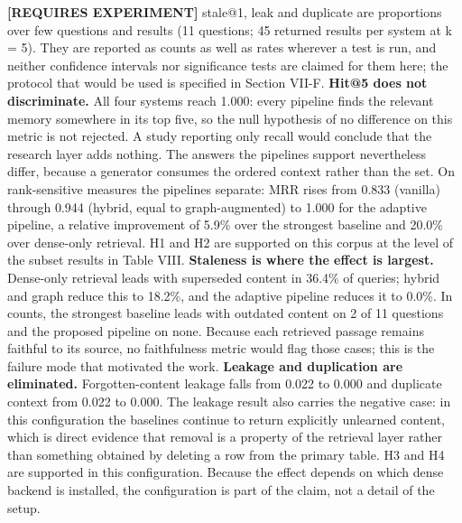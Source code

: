 \documentclass[conference]{IEEEtran}
\begin{document}
\textbf{[REQUIRES EXPERIMENT]} stale@1, leak and duplicate are proportions over few questions and results (11 questions; 45 returned results per system at k = 5). They are reported as counts as well as rates wherever a test is run, and neither confidence intervals nor significance tests are claimed for them here; the protocol that would be used is specified in Section VII-F.
\textbf{Hit@5 does not discriminate.} All four systems reach 1.000: every pipeline finds the relevant memory somewhere in its top five, so the null hypothesis of no difference on this metric is not rejected. A study reporting only recall would conclude that the research layer adds nothing. The answers the pipelines support nevertheless differ, because a generator consumes the ordered context rather than the set. On rank-sensitive measures the pipelines separate: MRR rises from 0.833 (vanilla) through 0.944 (hybrid, equal to graph-augmented) to 1.000 for the adaptive pipeline, a relative improvement of 5.9\% over the strongest baseline and 20.0\% over dense-only retrieval. H1 and H2 are supported on this corpus at the level of the subset results in Table VIII.
\textbf{Staleness is where the effect is largest.} Dense-only retrieval leads with superseded content in 36.4\% of queries; hybrid and graph reduce this to 18.2\%, and the adaptive pipeline reduces it to 0.0\%. In counts, the strongest baseline leads with outdated content on 2 of 11 questions and the proposed pipeline on none. Because each retrieved passage remains faithful to its source, no faithfulness metric would flag those cases; this is the failure mode that motivated the work.
\textbf{Leakage and duplication are eliminated.} Forgotten-content leakage falls from 0.022 to 0.000 and duplicate context from 0.022 to 0.000. The leakage result also carries the negative case: in this configuration the baselines continue to return explicitly unlearned content, which is direct evidence that removal is a property of the retrieval layer rather than something obtained by deleting a row from the primary table. H3 and H4 are supported in this configuration. Because the effect depends on which dense backend is installed, the configuration is part of the claim, not a detail of the setup.
\end{document}
